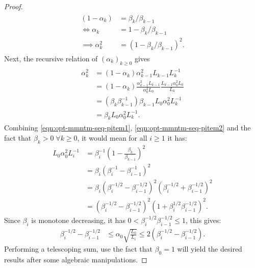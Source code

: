 \documentclass[12pt]{article}
\begin{document}
\begin{proof}
\begin{align}
\begin{split}
                (1 - \alpha_k) &= \beta_k/\beta_{k - 1}
                \\
                \iff 
                \alpha_k &= 1 - \beta_k / \beta_{k - 1}
                \\
                \implies 
                \alpha_k^2 &= (1 - \beta_k / \beta_{k - 1})^2.     
            \end{split}\end{align}
            Next, the recursive relation of $(\alpha_k)_{k \ge 0}$ gives
            \begin{align}\label{eqn:opt-mmntm-seq-pitem2}\begin{split}
                \alpha_k^2&= (1 - \alpha_k)\alpha_{k - 1}^2L_{k - 1}L_k^{-1}
                \\
                &= 
                (1 - \alpha_k)
                \frac{\alpha_{k - 1}^2L_{k - 1}}{\alpha_0^2L_0}
                \frac{L_{k - 1}\alpha_0^2L_0}{L_k}
                \\
                &= 
                (\beta_k\beta_{k - 1}^{-1})\beta_{k - 1}L_0\alpha_0^2L_k^{-1}
                \\
                &= \beta_kL_0\alpha_0^2L_k^{-1}.         
            \end{split}\end{align}
            Combining \eqref{eqn:opt-mmntm-seq-pitem1}, \eqref{eqn:opt-mmntm-seq-pitem2} and the fact that $\beta_k > 0\;\forall k \ge 0$, it would mean for all $i \ge 1$ it has: 
            \begin{align*}
                L_0 \alpha_0^2 L_i^{-1} &= 
                \beta_i^{-1}\left(
                    1 - \frac{\beta_k}{\beta_{k - 1}}
                \right)^2
                \\
                &= 
                \beta_i \left(
                    \beta_i^{-1} - \beta_{i - 1}^{-1}
                \right)^2
                \\
                &=
                \beta_i \left(
                    \beta_i^{-1/2} - \beta_{i - 1}^{-1/2}
                \right)^2
                \left(
                    \beta_i^{-1/2} + \beta_{i - 1}^{-1/2}
                \right)^2
                \\
                &= \left(
                    \beta_i^{-1/2} - \beta_{i - 1}^{-1/2}
                \right)^2\left(
                    1 + \beta_i^{1/2}\beta_{i - 1}^{-1/2}
                \right)^2. 
            \end{align*}
            Since $\beta_i$ is monotone decreasing, it has $0 < \beta_i^{-1/2}\beta_{i - 1}^{-1/2} \le 1$, this gives: 
            \begin{align*}
                \beta_i^{-1/2} - \beta_{i - 1}^{-1/2} 
                &\le \alpha_0\sqrt{\frac{L_0}{L_i}} 
                \le 2 \left(
                    \beta_i^{-1/2} - \beta_{i - 1}^{-1/2}
                \right).
            \end{align*}
            Performing a telescoping sum, use the fact that $\beta_0 = 1$ will yield the desired results after some algebraic manipulations. 
        \end{proof}
\end{document}
